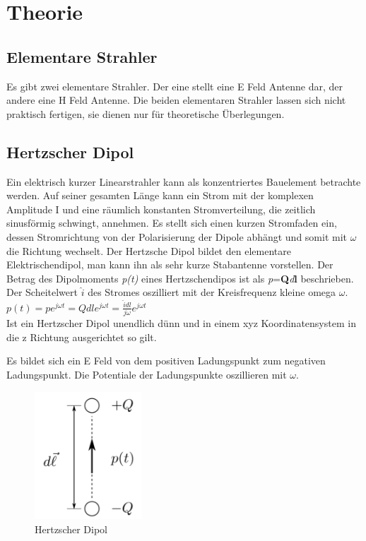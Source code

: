 \newpage
\section{Theorie}
\subsection{Elementare Strahler}
Es gibt zwei elementare Strahler. Der eine stellt eine E Feld Antenne dar, der andere eine H Feld Antenne. Die beiden elementaren Strahler lassen sich nicht praktisch fertigen, sie dienen nur für theoretische Überlegungen. 
\subsection{Hertzscher Dipol }
Ein elektrisch kurzer Linearstrahler kann als konzentriertes Bauelement betrachte werden. Auf seiner gesamten Länge kann ein Strom mit der komplexen Amplitude I und eine räumlich konstanten Stromverteilung, die zeitlich sinusförmig schwingt, annehmen. Es stellt sich einen kurzen Stromfaden ein, dessen Stromrichtung von der Polarisierung der Dipole abhängt und somit mit $\omega $ die Richtung wechselt. 
Der Hertzsche Dipol bildet den elementare Elektrischendipol, man kann ihn als sehr kurze Stabantenne vorstellen. Der Betrag des Dipolmoments \textit{p(t)} eines Hertzschendipos ist als \textit{p}=\textbf{Q}\textit{d}\textbf{\textbf{l}} beschrieben. Der Scheitelwert $\hat{i}$ des Stromes  oszilliert mit der Kreisfrequenz kleine omega $\omega$.\\
$p(t)=pe^{j\omega t} = Q dl e^{j\omega t} = \frac{\hat{i} dl}{j\omega }e^{j\omega t}  $
\\
Ist ein Hertzscher Dipol unendlich dünn und in einem xyz Koordinatensystem in die z Richtung ausgerichtet so gilt.
 
Es bildet sich ein E Feld von dem positiven Ladungspunkt zum negativen Ladungspunkt. Die Potentiale der Ladungspunkte oszillieren mit $\omega$. 


\begin{figure}[!htb]
	\centering
	\includegraphics[width=4cm]{content/bilder/HerzDipolEMANTS37.pdf}%
	\caption{Hertzscher Dipol}
	\label{HerzDipol}
\end{figure}

